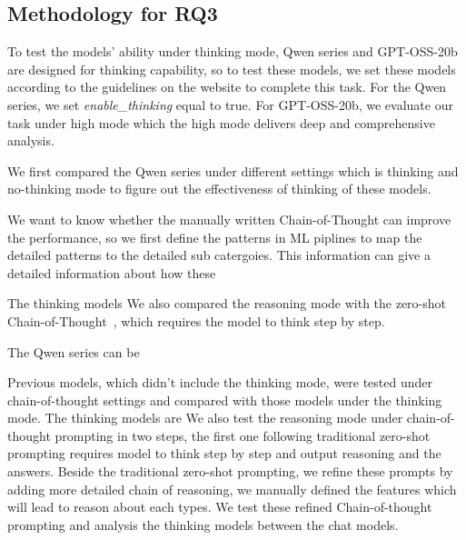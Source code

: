 \documentclass[acmsmall,screen,review,anonymous]{acmart}
\begin{document}
\subsection{Methodology for RQ3}\label{sec:RQ3}

To test the models' ability under thinking mode, Qwen series and GPT-OSS-20b are designed for thinking capability, so to test these models, we set these models according to the guidelines on the website to complete this task. For the Qwen series, we set \textit{enable\_thinking} equal to true. For GPT-OSS-20b, we evaluate our task under high mode which the high mode delivers deep and comprehensive analysis. 



We first compared the Qwen series under different settings which is thinking and no-thinking mode to figure out the effectiveness of thinking of these models.

We want to know whether the manually written Chain-of-Thought can improve the performance, so we first define the patterns in ML piplines to map the detailed patterns to the detailed sub catergoies. This information can give a detailed information about how these 

The thinking models We also compared the reasoning mode with the zero-shot Chain-of-Thought~\cite{kojima2022large}, which requires the model to think step by step. 


The Qwen series can be  

Previous models, which didn't include the thinking mode, were tested under chain-of-thought settings and compared with those models under the thinking mode. The thinking models are We also test the reasoning mode under chain-of-thought prompting in two steps, the first one following traditional zero-shot prompting requires model to think step by step and output reasoning and the answers. Beside the traditional zero-shot prompting, we refine these prompts by adding more detailed chain of reasoning, we manually defined the features which will lead to reason about each types. We test these refined Chain-of-thought prompting and analysis the thinking models between the chat models.




\end{document}
